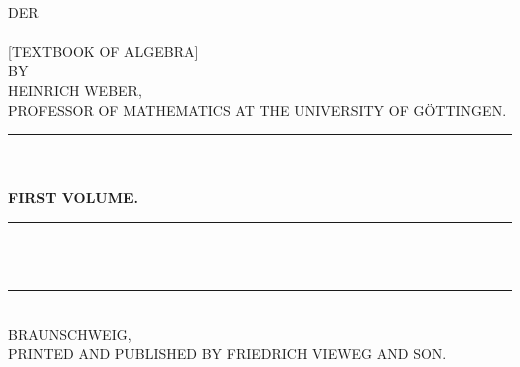 \begin{center}
\vspace*{2cm}
{\LARGE {}}\\[1.5em]
{\small DER}\\[1.5em]
{\Huge {}}\\[0.8em]
{\large [TEXTBOOK OF ALGEBRA]}\\[2.5em]
{\small BY}\\[1.5em]
{\LARGE HEINRICH WEBER,}\\[0.4em]
{\footnotesize PROFESSOR OF MATHEMATICS AT THE UNIVERSITY OF GÖTTINGEN.}\\[2em]
\rule{3cm}{0.4pt}\\[3em]
{\large {}}\\[2em]
{\large \textbf{FIRST VOLUME.}}\\[2em]
\rule{2.5cm}{0.4pt}\\[2.5em]
{\small {}}\\[3em]
\rule{\textwidth}{1pt}\\[1.5em]
{\large BRAUNSCHWEIG,}\\[0.5em]
{\small PRINTED AND PUBLISHED BY FRIEDRICH VIEWEG AND SON.}\\[0.5em]
{\large {}}
\end{center}
